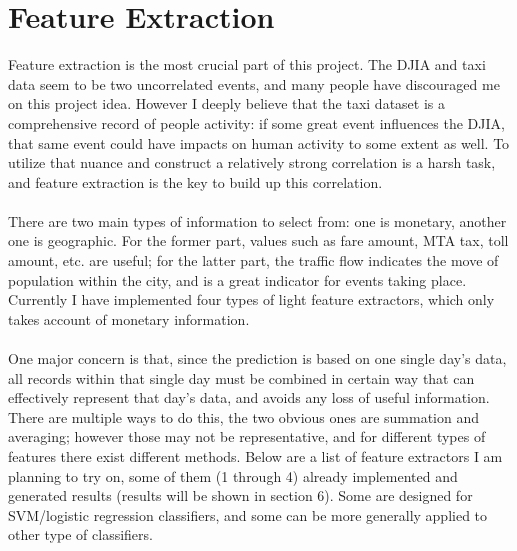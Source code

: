 \documentclass[a4paper]{article}
\begin{document}
\section{Feature Extraction}
Feature extraction is the most crucial part of this project. The DJIA and taxi data seem to be two uncorrelated events, and many people have discouraged me on this project idea. However I deeply believe that the taxi dataset is a comprehensive record of people activity: if some great event influences the DJIA, that same event could have impacts on human activity to some extent as well. To utilize that nuance and construct a relatively strong correlation is a harsh task, and feature extraction is the key to build up this correlation. \\\\          There are two main types of information to select from: one is monetary, another one is geographic. For the former part, values such as fare amount, MTA tax, toll amount, etc. are useful; for the latter part, the traffic flow indicates the move of population within the city, and is a great indicator for events taking place. Currently I have implemented four types of light feature extractors, which only takes account of monetary information. \\\\
One major concern is that, since the prediction is based on one single day's data, all records within that single day must be combined in certain way that can effectively represent that day's data, and avoids any loss of useful information. There are multiple ways to do this, the two obvious ones are summation and averaging; however those may not be representative, and for different types of features there exist different methods. Below are a list of feature extractors I am planning to try on, some of them (1 through 4) already implemented and generated results (results will be shown in section 6). Some are designed for SVM/logistic regression classifiers, and some can be more generally applied to other type of classifiers. 
\end{document}
